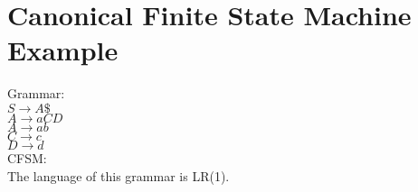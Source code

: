 
\section{Canonical Finite State Machine Example}
Grammar:\\
$S \rightarrow A\$$\\
$A \rightarrow aCD$\\
$A \rightarrow ab$\\
$C \rightarrow c$\\
$D \rightarrow d$\\

CFSM:\\

The language of this grammar is LR(1).